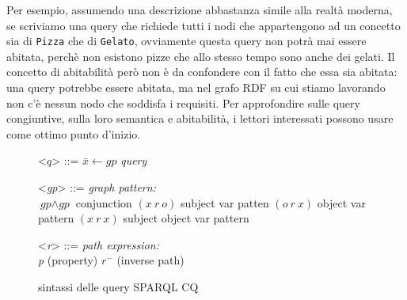 \noindent Per esempio, assumendo una descrizione abbastanza simile alla realtà moderna, se scriviamo una query che richiede tutti i nodi che appartengono ad un concetto sia di \texttt{Pizza} che di \texttt{Gelato}, ovviamente questa query non potrà mai essere abitata, perchè non esistono pizze che allo stesso tempo sono anche dei gelati. Il concetto di abitabilità però non è da confondere con il fatto che essa sia abitata: una query potrebbe essere abitata, ma nel grafo RDF su cui stiamo lavorando non c'è nessun nodo che soddisfa i requisiti. Per approfondire sulle query congiuntive, sulla loro semantica e abitabilità, i lettori interessati possono usare \cite{baader2017introductionDL} come ottimo punto d'inizio.
\begin{figure}[h]
	\centering
	\begin{minipage}{0.5\textwidth}
		
		\setlength{\grammarindent}{6em} %
		\begin{grammar}
		\let\syntleft\relax
		\let\syntright\relax
		<$q$> ::= $\bar{x} \leftarrow \textit{gp}$ \hfill \textit{query}
		
		<\textit{gp}> ::= \hfill \textit{graph pattern:}\\
		$\textit{gp} \wedge \textit{gp}$ \hfill conjunction
		\alt $(x\ r\ o)$ \hfill subject var patten
		\alt $(o\ r\ x)$ \hfill object var pattern
		\alt $(x\ r\ x)$ \hfill subject object var pattern
		
		<\textit{r}> ::= \hfill \textit{path expression:}\\
		\textit{p} \hfill (property)
		\alt $r^-$ \hfill (inverse path)
		
	\end{grammar}
	\end{minipage}
    \caption{sintassi delle query SPARQL CQ}
    \label{fig:leinbergerSyntax}
\end{figure}
\newpage
